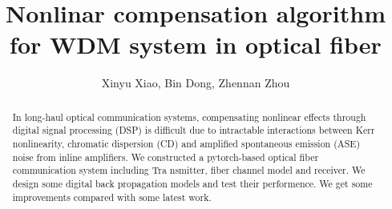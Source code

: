 \documentclass[10pt,a4paper]{article}
\begin{document}
\begin{CJK}{UTF8}{gbsn}
\title{Nonlinar compensation algorithm for WDM system in optical fiber}
\author{Xinyu Xiao, Bin Dong, Zhennan Zhou} 
\maketitle
\tableofcontents

\begin{abstract}
In long-haul optical communication systems, compensating nonlinear effects through digital signal processing (DSP) 
is difficult due to intractable interactions between Kerr nonlinearity, chromatic dispersion (CD) and amplified 
spontaneous emission (ASE) noise from inline amplifiers. We constructed a pytorch-based optical fiber communication 
system including Tra  nsmitter, fiber channel model and receiver. We design some 
digital back propagation models and test their performence. We get some improvements
compared with some latest work.
\end{abstract}






\newpage
\printbibliography{}
\end{CJK}
\end{document}

